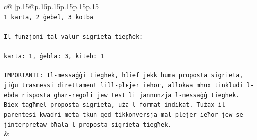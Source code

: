 \documentclass{article}
\begin{document}
{\begin{supertabular}{c@{$\;$}|p{.15\linewidth}@{}p{.15\linewidth}p{.15\linewidth}p{.15\linewidth}p{.15\linewidth}p{.15\linewidth}}
{{{\\ 
\texttt{1 karta, 2 ġebel, 3 kotba} \\
\\ 
\texttt{Il{-}funzjoni tal{-}valur sigrieta tiegħek:} \\
\\ 
\texttt{karta: 1, ġebla: 3, kiteb: 1} \\
\\ 
\texttt{IMPORTANTI: Il{-}messaġġi tiegħek, ħlief jekk huma proposta sigrieta, jiġu trasmessi direttament lill{-}plejer ieħor, allokwa mhux tinkludi l{-}ebda risposta għar{-}regoli jew test li jannunzja l{-}messaġġ tiegħek. Biex tagħmel proposta sigrieta, uża l{-}format indikat. Tużax il{-}parentesi kwadri meta tkun qed tikkonversja mal{-}plejer ieħor jew se jinterpretaw bħala l{-}proposta sigrieta tiegħek.} \\
            }
        }
    }
    & \\ \\


\end{supertabular}}
\end{document}
